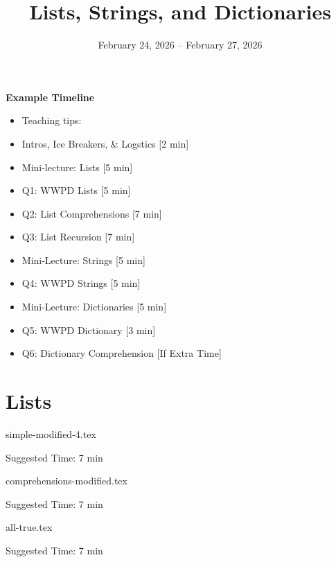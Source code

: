 \documentclass{exam}
\title{Lists, Strings, and Dictionaries}
\date{February 24, 2026 -- February 27, 2026}
\begin{document}
\maketitle

\begin{meta}
    \textbf{Example Timeline}
    \begin{itemize}
        \item Teaching tips:
        
        \item Intros, Ice Breakers, \& Logstics [2 min]
        \item Mini-lecture: Lists [5 min]
        \item Q1: WWPD Lists [5 min]
        \item Q2: List Comprehensions [7 min]
        \item Q3: List Recursion [7 min]
        \item Mini-Lecture: Strings [5 min]
        \item Q4: WWPD Strings [5 min]
        \item Mini-Lecture: Dictionaries [5 min]
        \item Q5: WWPD Dictionary [3 min]
        \item Q6: Dictionary Comprehension [If Extra Time]
    
    \end{itemize}
\end{meta}

\section{Lists}
\begin{questions}
    {simple-modified-4.tex}
    \begin{questionmeta}
        Suggested Time: 7 min
    \end{questionmeta}

    {comprehensions-modified.tex}
    \begin{questionmeta}
        Suggested Time: 7 min
    \end{questionmeta}

    {all-true.tex}
    \begin{questionmeta}
        Suggested Time: 7 min
    \end{questionmeta}
\end{questions}
\end{document}
